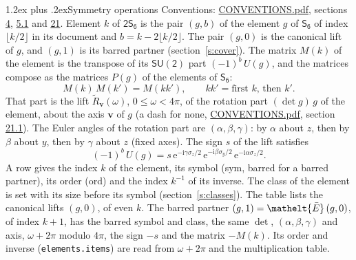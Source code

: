 \documentclass[10pt,a4paper]{article}
\makeatletter
\renewcommand\section{\@startsection{section}{1}{\z@}{-3ex plus -1ex minus -.2ex}%
  {1.2ex plus .2ex}{\normalfont\large\sffamily\bfseries\color{parttitle}}}
\numberwithin{equation}{section}
\newcommand{\eltfont}[1]{{\let\sigma\eltsigma\mathelt{#1}}}
\newcommand{\grp}[1]{\mathsf{#1}}
\newcommand{\elt}[1]{\eltfont{#1}}
\newcommand{\vv}{\mathbf{v}}
\newcommand{\iunit}{\mathrm{i}}
\newcommand{\expe}{\mathrm{e}}
\newcommand{\barred}[1]{\bar{#1}}
\newcommand{\lift}[1]{\tilde{#1}}
\newcommand{\pauli}[1]{\sigma_{#1}}
\makeatother
\begin{document}
\section{Symmetry operations}\label{s:elements}
Conventions: \href{../../CONVENTIONS.pdf}{CONVENTIONS.pdf}, sections \href{../../../rotation/CONVENTIONS.pdf\#conv.4}{4}, \href{../../../rotation/CONVENTIONS.pdf\#conv.5.1}{5.1} and \href{../../CONVENTIONS.pdf\#conv.21}{21}.
\leavevmode\label{n:index.element}\label{n:element.g}Element $k$ of $\grp{2S_{6}}$ is the pair $(g, b)$ of the element $g$ of \href{../../../rotation/data/pdf/S6.pdf}{$\grp{S_{6}}$} of index $\lfloor k/2\rfloor$ in its document and $b = k - 2\lfloor k/2\rfloor$. The pair $(g, 0)$ is the canonical lift of $g$, and $(g, 1)$ is its barred partner (section~\ref{s:cover}). \label{n:matrix.element.pin}\label{n:matrix.element}The matrix $M(k)$ of the element is the transpose of its $\grp{SU(2)}$ part $(-1)^{b}\,U(g)$, and the matrices compose as the matrices $P(g)$ of the elements of $\grp{S_{6}}$:
\begin{equation}\label{e:mprod}M(k)\,M(k') = M(kk'),\qquad kk' = \text{first } k\text{, then } k'.\end{equation}
\leavevmode\label{n:angle.omega}\label{n:vector.axis}\label{n:vector.pole}That part is the lift $\lift{R}_{\vv}(\omega)$, $0 \le \omega < 4\pi$, of the rotation part $(\det g)\,g$ of the element, about the axis $\vv$ of $g$ (a dash for none, \href{../../CONVENTIONS.pdf}{CONVENTIONS.pdf}, section \href{../../CONVENTIONS.pdf\#conv.21.1}{21.1}). \label{n:angle.euler.alpha}\label{n:angle.euler.beta}\label{n:angle.euler.gamma}\label{n:vector.coordinates}The Euler angles of the rotation part are $(\alpha,\beta,\gamma)$: by $\alpha$ about $z$, then by $\beta$ about $y$, then by $\gamma$ about $z$ (fixed axes). \label{n:local.euler.sign}The sign $s$ of the lift satisfies
\begin{equation}\label{e:euler}(-1)^{b}\,U(g) = s\,\expe^{-\iunit\gamma\pauli{z}/2}\,\expe^{-\iunit\beta\pauli{y}/2}\,\expe^{-\iunit\alpha\pauli{z}/2}.\end{equation}
\leavevmode\label{n:index.element.inverse}\label{n:head.sym}\label{n:head.ord}A row gives the index $k$ of the element, its symbol (sym, barred for a barred partner), its order (ord) and the index $k^{-1}$ of its inverse. \label{n:head.class}The class of the element is set with its size before its symbol (section~\ref{s:classes}).
The table lists the canonical lifts $(g, 0)$, of even $k$. The barred partner $(g, 1) = \elt{\barred{E}}\,(g, 0)$, of index $k + 1$, has the barred symbol and class, the same $\det$, $(\alpha,\beta,\gamma)$ and axis, $\omega + 2\pi$ modulo $4\pi$, the sign $-s$ and the matrix $-M(k)$. Its order and inverse (\texttt{elements.items}) are read from $\omega + 2\pi$ and the multiplication table.
\end{document}
